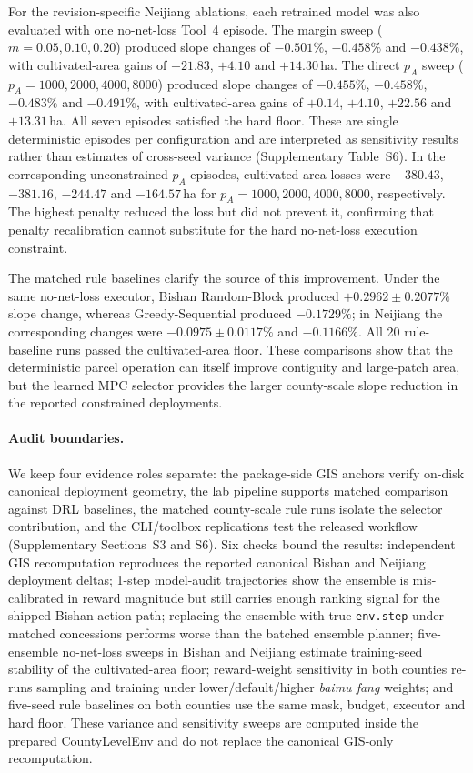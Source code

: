 \documentclass[11pt]{article}
\begin{document}
For the revision-specific Neijiang ablations, each retrained model was also evaluated with one no-net-loss Tool~4 episode. The margin sweep ($m=0.05,0.10,0.20$) produced slope changes of $-0.501\%$, $-0.458\%$ and $-0.438\%$, with cultivated-area gains of $+21.83$, $+4.10$ and $+14.30$\,ha. The direct $p_A$ sweep ($p_A=1000,2000,4000,8000$) produced slope changes of $-0.455\%$, $-0.458\%$, $-0.483\%$ and $-0.491\%$, with cultivated-area gains of $+0.14$, $+4.10$, $+22.56$ and $+13.31$\,ha. All seven episodes satisfied the hard floor. These are single deterministic episodes per configuration and are interpreted as sensitivity results rather than estimates of cross-seed variance (Supplementary Table~S6).
In the corresponding unconstrained $p_A$ episodes, cultivated-area losses were $-380.43$, $-381.16$, $-244.47$ and $-164.57$\,ha for $p_A=1000,2000,4000,8000$, respectively. The highest penalty reduced the loss but did not prevent it, confirming that penalty recalibration cannot substitute for the hard no-net-loss execution constraint.

The matched rule baselines clarify the source of this improvement. Under the same no-net-loss executor, Bishan Random-Block produced $+0.2962\pm0.2077\%$ slope change, whereas Greedy-Sequential produced $-0.1729\%$; in Neijiang the corresponding changes were $-0.0975\pm0.0117\%$ and $-0.1166\%$. All 20 rule-baseline runs passed the cultivated-area floor. These comparisons show that the deterministic parcel operation can itself improve contiguity and large-patch area, but the learned MPC selector provides the larger county-scale slope reduction in the reported constrained deployments.

\paragraph{Audit boundaries.} We keep four evidence roles separate: the package-side GIS anchors verify on-disk canonical deployment geometry, the lab pipeline supports matched comparison against DRL baselines, the matched county-scale rule runs isolate the selector contribution, and the CLI/toolbox replications test the released workflow (Supplementary Sections~S3 and S6). Six checks bound the results: independent GIS recomputation reproduces the reported canonical Bishan and Neijiang deployment deltas; 1-step model-audit trajectories show the ensemble is mis-calibrated in reward magnitude but still carries enough ranking signal for the shipped Bishan action path; replacing the ensemble with true \texttt{env.step} under matched concessions performs worse than the batched ensemble planner; five-ensemble no-net-loss sweeps in Bishan and Neijiang estimate training-seed stability of the cultivated-area floor; reward-weight sensitivity in both counties re-runs sampling and training under lower/default/higher \textit{baimu fang} weights; and five-seed rule baselines on both counties use the same mask, budget, executor and hard floor. These variance and sensitivity sweeps are computed inside the prepared CountyLevelEnv and do not replace the canonical GIS-only recomputation.
\end{document}
